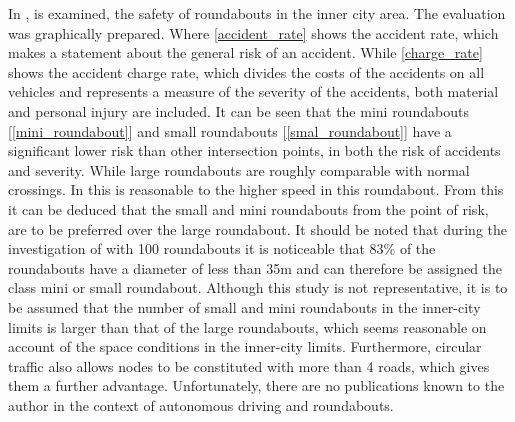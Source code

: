 In \cite{Baumert1998, brilon2002verkehrssicherheit, brilon2004uberprufung,voss1994verkehrssicherheit}, is examined, the safety of roundabouts in the inner city area.
The evaluation was graphically prepared. Where \cref{accident_rate} shows the accident rate, which makes a statement about the general risk of an accident.
While \cref{charge_rate} shows the accident charge rate, which divides the costs of the accidents on all vehicles and represents a measure of the severity of the accidents,
both material and personal injury are included. It can be seen that the mini roundabouts [\cref{mini_roundabout}] and small roundabouts [\cref{smal_roundabout}] have a significant 
lower risk than other intersection points, in both the risk of accidents and severity. While large roundabouts are roughly comparable with normal crossings. 
In \cite{Bondzio2012} this is reasonable to the higher speed in this roundabout. From this it can be deduced that the small and mini roundabouts from the point of risk,
are to be preferred over the large roundabout. It should be noted that during the investigation of \cite{Bondzio2012} with 100 roundabouts it is noticeable that 83\%
of the roundabouts have a diameter of less than 35m and can therefore be assigned the class mini or small roundabout.
Although this study is not representative, it is to be assumed that the number of small and mini roundabouts in the inner-city limits is larger than that of the large roundabouts,
which seems reasonable on account of the space conditions in the inner-city limits.
Furthermore, circular traffic also allows nodes to be constituted with more than 4 roads, which gives them a further advantage.
Unfortunately, there are no publications known to the author in the context of autonomous driving and roundabouts.

